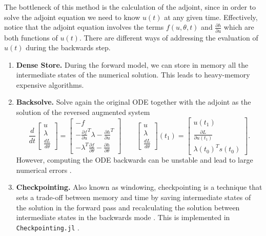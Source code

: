 The bottleneck of this method is the calculation of the adjoint, since in order to solve the adjoint equation we need to know $u(t)$ at any given time. 
Effectively, notice that the adjoint equation involves the terms $f(u, \theta, t)$ and $\frac{\partial h}{\partial u}$ which are both functions of $u(t)$. 
There are different ways of addressing the evaluation of $u(t)$ during the backwards step.
\begin{enumerate}[label=(\roman*)]
    \item \textbf{Dense Store.} During the forward model, we can store in memory all the intermediate states of the numerical solution. 
    This leads to heavy-memory expensive algorithms. 
    \item \textbf{Backsolve.} Solve again the original ODE together with the adjoint as the solution of the reversed augmented system \cite{chen_neural_2019}
    \begin{equation}
    \frac{d}{dt}
    \begin{bmatrix}
       u \\
       \lambda \\
       \frac{dL}{d\theta}
    \end{bmatrix}
    = 
    \begin{bmatrix}
       -f \\
       - \frac{\partial f}{\partial u}^T \lambda - \frac{\partial h}{\partial u}^T \\
       - \lambda^T \frac{\partial f}{\partial \theta} - \frac{\partial h}{\partial \theta}
    \end{bmatrix}
    \qquad 
    \begin{bmatrix}
       u \\
       \lambda \\
       \frac{dL}{d\theta}
    \end{bmatrix}(t_1)
    = 
    \begin{bmatrix}
       u(t_1) \\
       \frac{\partial L}{\partial u(t_1)} \\
       \lambda(t_0)^T s(t_0)
    \end{bmatrix}.
    \end{equation}
    However, computing the ODE backwards can be unstable and lead to large numerical errors \cite{kim_stiff_2021, Zhuang_2020}. 
    \item \textbf{Checkpointing. } Also known as windowing, checkpointing is a technique that sets a trade-off between memory and time by saving intermediate states of the solution in the forward pass and recalculating the solution between intermediate states in the backwards mode \cite{Checkpoiting_2023, griewank2008evaluatingderivatives}. 
    This is implemented in \texttt{Checkpointing.jl} \cite{Checkpoiting_2023}.
\end{enumerate} 

